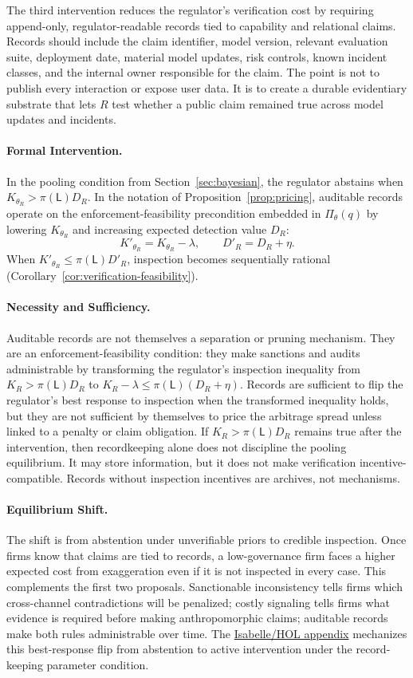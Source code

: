 \documentclass[review,authoryear]{elsarticle}
\theoremstyle{definition}
\theoremstyle{plain}
\begin{document}
The third intervention reduces the regulator's verification cost by requiring
append-only, regulator-readable records tied to capability and relational
claims. Records should include the claim identifier, model version, relevant
evaluation suite, deployment date, material model updates, risk controls,
known incident classes, and the internal owner responsible for the claim. The
point is not to publish every interaction or expose user data. It is to create a
durable evidentiary substrate that lets $R$ test whether a public claim remained
true across model updates and incidents.

\paragraph{Formal Intervention.}
In the pooling condition from Section~\ref{sec:bayesian}, the
regulator abstains when $K_{\theta_R}>\pi(\mathsf{L})D_R$.  In the notation of
Proposition~\ref{prop:pricing}, auditable records operate on the
enforcement-feasibility precondition embedded in $\Pi_\theta(q)$ by
lowering $K_{\theta_R}$ and increasing expected detection value $D_R$:
\[
K'_{\theta_R}=K_{\theta_R}-\lambda,\qquad
D'_R=D_R+\eta .
\]
When $K'_{\theta_R}\leq \pi(\mathsf{L})D'_R$, inspection becomes sequentially
rational (Corollary~\ref{cor:verification-feasibility}).

\paragraph{Necessity and Sufficiency.}
Auditable records are not themselves a separation or pruning mechanism.
They are an enforcement-feasibility condition: they make sanctions and audits
administrable by transforming the regulator's inspection inequality from
$K_R>\pi(\mathsf{L})D_R$ to $K_R-\lambda \le \pi(\mathsf{L})(D_R+\eta)$.
Records are sufficient to flip the regulator's best response to inspection when
the transformed inequality holds, but they are not sufficient by themselves to
price the arbitrage spread unless linked to a penalty or claim obligation.
If $K_R>\pi(\mathsf{L})D_R$ remains true after the intervention, then
recordkeeping alone does not discipline the pooling equilibrium.  It may store
information, but it does not make verification incentive-compatible.  Records
without inspection incentives are archives, not mechanisms.

\paragraph{Equilibrium Shift.}
The shift is from abstention under unverifiable priors to credible inspection.
Once firms know that claims are tied to records, a low-governance firm faces a
higher expected cost from exaggeration even if it is not inspected in every
case. This complements the first two proposals. Sanctionable inconsistency tells
firms which cross-channel contradictions will be penalized; costly signaling
tells firms what evidence is required before making anthropomorphic claims;
auditable records make both rules administrable over time. The \hyperref[app:isabelle]{Isabelle/HOL appendix} mechanizes this best-response flip from abstention to active intervention under the record-keeping parameter condition.
\end{document}
